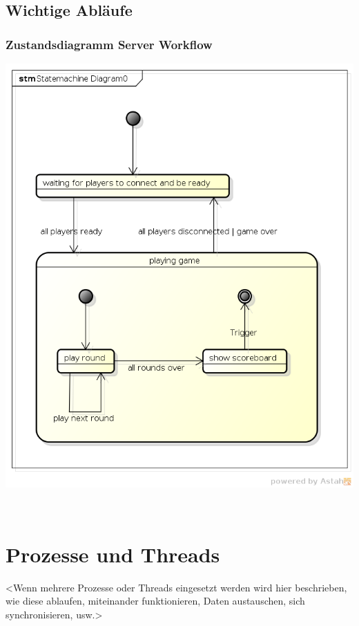 \documentclass[11pt]{scrartcl}
\begin{document}
\newpage

\subsection{Wichtige Abläufe}
\subsubsection{Zustandsdiagramm Server Workflow}
\includegraphics[scale=0.7]{StatemachineServer}













 
\section{Prozesse und Threads}
<Wenn mehrere Prozesse oder Threads eingesetzt werden wird hier beschrieben, wie diese ablaufen, miteinander funktionieren, Daten austauschen, sich synchronisieren, usw.>
 
\end{document}
